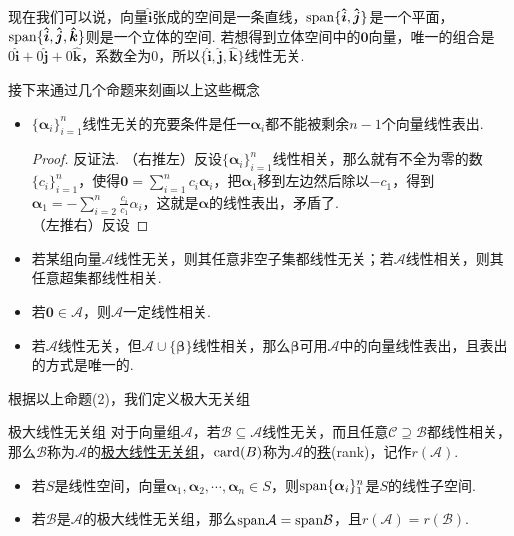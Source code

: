 \documentclass[main.tex]{subfiles}
\begin{document}
现在我们可以说，向量\(\bm{\hat i}\)张成的空间是一条直线，\({\rm span}\{\bm{\hat i},\bm{\hat j}\}\)是一个平面，\({\rm span}\{\bm{\hat i}, \bm{\hat j}, \bm{\hat k}\}\)则是一个立体的空间. 若想得到立体空间中的\(\bm 0\)向量，唯一的组合是\(0\bm{\hat{i}}+0\bm{\hat{j}}+0\bm{\hat{k}}\)，系数全为\(0\)，所以\(\{\bm{\hat i}, \bm{\hat j}, \bm{\hat k}\}\)线性无关.

接下来通过几个命题来刻画以上这些概念
\begin{itemize}
    \item [(1)] \(\{\bm\alpha_i\}_{i=1}^{n}\)线性无关的充要条件是任一\(\bm\alpha_i\)都不能被剩余\(n-1\)个向量线性表出.
    \begin{proof}
        反证法. （右推左）反设\(\{\bm\alpha_i\}_{i=1}^{n}\)线性相关，那么就有不全为零的数\(\{c_i\}_{i=1}^{n}\)，使得\(\displaystyle{\bm 0 = \sum_{i=1}^{n}c_i\bm\alpha_i}\)，把\(\bm\alpha_1\)移到左边然后除以\(-c_1\)，得到\(\displaystyle{\bm\alpha_1 = -\sum_{i=2}^{n}\frac{c_i}{c_1}\alpha_i}\)，这就是\(\bm\alpha\)的线性表出，矛盾了. \\
        （左推右）反设
    \end{proof}
    \item [(2)] 若某组向量\(\mathcal{A}\)线性无关，则其任意非空子集都线性无关；若\(\mathcal{A}\)线性相关，则其任意超集都线性相关.
    \item [(3)] 若\(\bm 0 \in \mathcal{A}\)，则\(\mathcal{A}\)一定线性相关.
    \item [(4)] 若\(\mathcal{A}\)线性无关，但\(\mathcal{A} \cup \{\bm\beta\}\)线性相关，那么\(\bm\beta\)可用$\mathcal A$中的向量线性表出，且表出的方式是唯一的.
\end{itemize}

根据以上命题(2)，我们定义极大无关组

\begin{definition}{极大线性无关组}
    对于向量组\(\mathcal A\)，若\(\mathcal B \subseteq \mathcal A\)线性无关，而且任意\(\mathcal{C} \supseteq \mathcal{B}\)都线性相关，那么\(\mathcal B\)称为\(\mathcal{A}\)的\uline{极大线性无关组}，\({\rm card}(B)\)称为\(\mathcal A\)的\uline{秩}(rank)，记作\(r(\mathcal{A})\).
\end{definition}

\begin{itemize}
    \item [(5)] 若\(S\)是线性空间，向量\(\bm\alpha_1,\bm\alpha_2,\cdots,\bm\alpha_n \in S\)，则\({\rm span}\{\bm\alpha_i\}_{1}^{n}\)是\(S\)的线性子空间.
    \item [(6)] 若\(\mathcal B\)是\(\mathcal A\)的极大线性无关组，那么\({\rm span}\mathcal{A} = {\rm span}\mathcal{B}\)，且\(r(\mathcal A) = r(\mathcal B)\).
\end{itemize}
\end{document}
